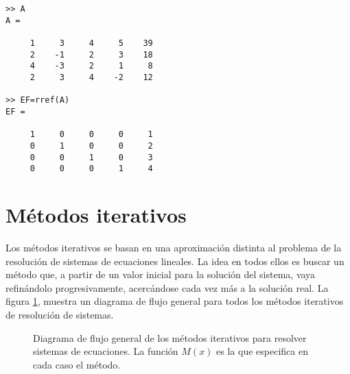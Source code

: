 \begin{verbatim}
>> A
A =

     1     3     4     5    39
     2    -1     2     3    18
     4    -3     2     1     8
     2     3     4    -2    12

>> EF=rref(A)
EF =

     1     0     0     0     1
     0     1     0     0     2
     0     0     1     0     3
     0     0     0     1     4
\end{verbatim}
 
\section{Métodos iterativos}
Los métodos iterativos se basan en una aproximación distinta al problema de la resolución de sistemas de ecuaciones lineales. La idea en todos ellos es buscar un método que, a partir de un valor inicial para la solución del sistema, vaya refinándolo progresivamente, acercándose cada vez más a la solución real. La figura \ref{fig:itera}, muestra un diagrama de flujo general para todos los métodos iterativos de resolución de sistemas.

\begin{figure}[h]
\centering
{}
\caption{Diagrama de flujo general de los métodos iterativos para resolver sistemas de ecuaciones. La función $M(x)$ es la que especifica en cada caso el método.}
\label{fig:itera}
\end{figure}

